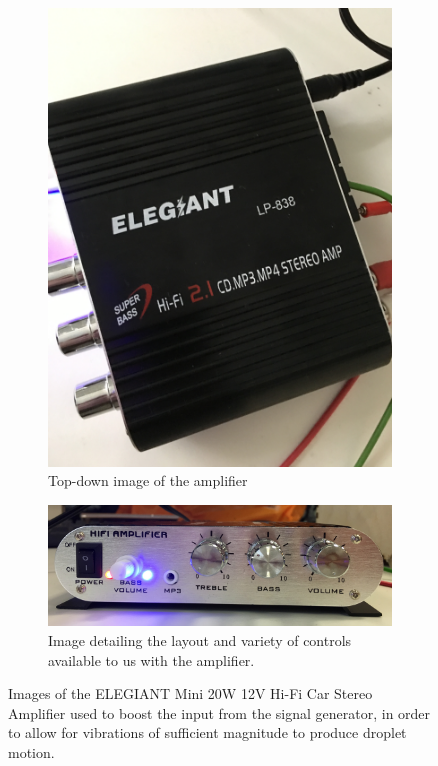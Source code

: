 \begin{figure}[ht]
    \begin{subfigure}{0.5\textwidth}
        \centering
        \includegraphics[width=\textwidth]{prototype/exp_rep_imgs/LEGIANT_amp.jpg}
        \caption{Top-down image of the amplifier}
    \end{subfigure}
    \begin{subfigure}{0.5\textwidth}
        \centering
        \includegraphics[width=\textwidth]{prototype/exp_rep_imgs/amp_controls.jpg}
        \caption{Image detailing the layout and variety of controls available to us with the amplifier.}
    \end{subfigure}
\caption{Images of the ELEGIANT Mini 20W 12V Hi-Fi Car Stereo Amplifier used to boost the input from the signal generator, in order to allow for vibrations of sufficient magnitude to produce droplet motion.}
\label{fig:amplifier}
\end{figure}

